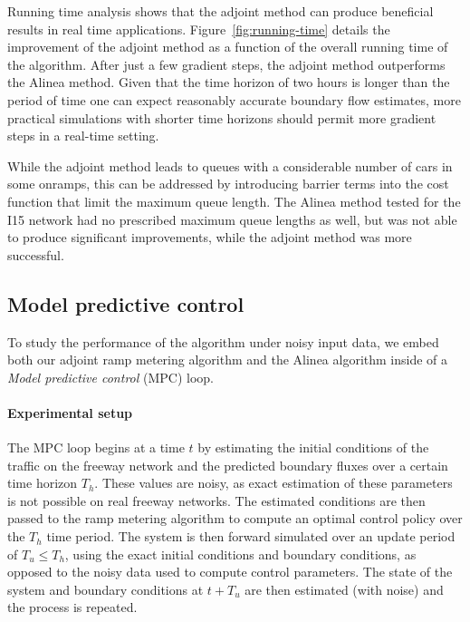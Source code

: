 																
								Running time analysis shows that the adjoint method can produce beneficial
								results in real time applications. Figure~\ref{fig:running-time} details the improvement of the adjoint method as a function of the overall running time of the algorithm. After just a few gradient steps, the
								adjoint method outperforms the Alinea method. Given that the time
								horizon of two hours is longer than the period of time one can expect
								reasonably accurate boundary flow estimates, more practical simulations
								with shorter time horizons should permit more gradient steps in a
								real-time setting.
																
								While the adjoint method leads to queues with a considerable number of cars in some onramps, this can be addressed by introducing barrier terms into the cost function that limit the
								maximum queue length. The Alinea method tested for the I15 network
								had no prescribed maximum queue lengths as well, but was not able
								to produce significant improvements, while the adjoint method was
								more successful.
																
																
								\subsection{Model predictive control\label{sub:Model-predictive-control}}
																
								To study the performance of the algorithm under noisy input data,
								we embed both our adjoint ramp metering algorithm and the Alinea algorithm
								inside of a \emph{Model predictive control }(MPC) loop.
																
																
								\paragraph{Experimental setup}
																
								The MPC loop begins at a time $t$ by estimating the initial conditions
								of the traffic on the freeway network and the predicted boundary fluxes
								over a certain time horizon $T_{h}$. These values are noisy, as exact
								estimation of these parameters is not possible on real freeway networks.
								The estimated conditions are then passed to the ramp metering algorithm
								to compute an optimal control policy over the $T_{h}$ time period.
								The system is then forward simulated over an update period of $T_{u}\le T_{h}$,
								using the exact initial conditions and boundary conditions, as opposed
								to the noisy data used to compute control parameters. The state of
								the system and boundary conditions at $t+T_{u}$ are then estimated
								(with noise) and the process is repeated.
																
